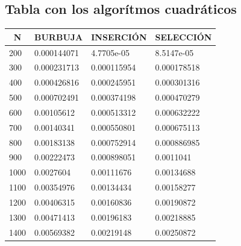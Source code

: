 \documentclass[11pt,spanish]{article} %
\begin{document}
\subsection{Tabla con los algor\'itmos cuadr\'aticos}
	\begin{center}
	\begin{longtable}{|l||l|l|l|}
	\hline
	\multicolumn{1}{|c||}{N} & \multicolumn{1}{c|}{BURBUJA} & \multicolumn{1}{c|}{INSERCIÓN} & \multicolumn{1}{c|}{SELECCIÓN} \\ \hline
200                     & 0.000144071                  & 4.7705e-05                     & 8.5147e-05                     \\ \hline
300                     & 0.000231713                  & 0.000115954                    & 0.000178518                    \\ \hline
400                     & 0.000426816                  & 0.000245951                    & 0.000301316                    \\ \hline
500                     & 0.000702491                  & 0.000374198                    & 0.000470279                    \\ \hline
600                     & 0.00105612                   & 0.000513312                    & 0.000632222                    \\ \hline
700                     & 0.00140341                   & 0.000550801                    & 0.000675113                    \\ \hline
800                     & 0.00183138                   & 0.000752914                    & 0.000886985                    \\ \hline
900                     & 0.00222473                   & 0.000898051                    & 0.0011041                      \\ \hline
1000                    & 0.0027604                    & 0.00111676                     & 0.00134688                     \\ \hline
1100                    & 0.00354976                   & 0.00134434                     & 0.00158277                     \\ \hline
1200                    & 0.00406315                   & 0.00160836                     & 0.00190872                     \\ \hline
1300                    & 0.00471413                   & 0.00196183                     & 0.00218885                     \\ \hline
1400                    & 0.00569382                   & 0.00219148                     & 0.00250872                     \\ \hline

\end{longtable}
\end{center}
\end{document}
